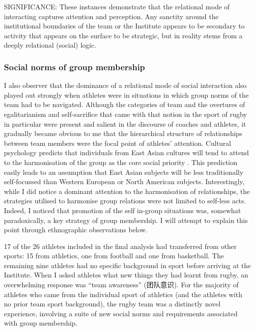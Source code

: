 \begin{CJK}{UTF8}{gbsn}
  SIGNIFICANCE: These instances demonstrate that the relational mode of interacting captures attention and perception. Any sanctity around the institutional boundaries of the team or the Institute appears to be secondary to activity that appears on the surface to be strategic, but in reality stems from a deeply relational (social) logic.

      \subsubsection{Social norms of group membership}

  I also observer that the dominance of a relational mode of social interaction also played out strongly when athletes were in situations in which group norms of the team had to be navigated.  Although the categories of team and the overtures of egalitarianism and self-sacrifice that came with that notion in the sport of rugby in particular were present and salient in the discourse of coaches and athletes, it gradually became obvious to me that the hierarchical structure of relationships between team members were the focal point of athletes' attention.  Cultural psychology predicts that individuals from East Asian cultures will tend to attend to the harmonisation of the group as the core social priority \citep{Yuki2003}.  This prediction easily leads to an assumption that East Asian subjects will be less traditionally self-focussed than Western European or North American subjects.  Interestingly, while I did notice a dominant attention to the harmonisation of relationships, the strategies utilised to harmonise group relations were not limited to self-less acts.  Indeed, I noticed that promotion of the self in-group situations was, somewhat paradoxically, a key strategy of group membership.  I will attempt to explain this point through ethnographic observations below.



  17 of the 26 athletes included in the final analysis had transferred from other sports: 15 from athletics, one from football and one from basketball.  The remaining nine athletes had no specific background in sport before arriving at the Institute.  When I asked athletes what new things they had learnt from rugby, an overwhelming response was ``team awareness'' (团队意识).  For the majority of athletes who came from the individual sport of athletics (and the athletes with no prior team sport background), the rugby team was a distinctly novel experience, involving a suite of new social norms and requirements associated with group membership.


\end{CJK}
